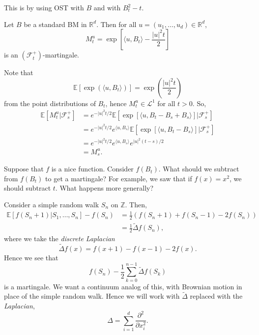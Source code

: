 \documentclass[12pt]{article}
\begin{document}
\begin{proofbox}
	This is by using OST with $B$ and with $B_t^2 - t$.
\end{proofbox}

\begin{proposition}
	Let $B$ be a standard BM in $\mathbb{R}^d$. Then for all $u = (u_1, \ldots, u_d) \in \mathbb{R}^d$,
	\[
		M_t^u = \exp \left[ \langle u, B_t \rangle - \frac{|u|^2t}{2} \right]
	\]
	is an $(\mathcal{F}_t^+)$-martingale.
\end{proposition}

\begin{proofbox}
	Note that
	\[
	\mathbb{E}[\exp ( \langle u, B_t \rangle)] = \exp \left( \frac{|u|^2 t}{2} \right)
	\]
	from the point distributions of $B_t$, hence $M_t^u \in \mathcal{L}^1$ for all $t > 0$. So,
	\begin{align*}
		\mathbb{E}[M_t^u | \mathcal{F}_s^+] &= e^{-|u|^2t/2} \mathbb{E}[\exp [\langle u, B_t - B_s + B_s \rangle ] | \mathcal{F}_s^+] \\
						    &= e^{-|u|^2t/2} e^{\langle u, B_s\rangle} \mathbb{E}[\exp [\langle u, B_t - B_s \rangle] | \mathcal{F}_s^+] \\
						    &= e^{-|u|^2t/2} e^{\langle u, B_s\rangle} e^{|u|^2(t-s)/2} \\
						    &= M_s^u.
	\end{align*}
\end{proofbox}

Suppose that $f$ is a nice function. Consider $f(B_t)$. What should we subtract from $f(B_t)$ to get a martingale? For example, we saw that if $f(x) = x^2$, we should subtract $t$. What happens more generally?

Consider a simple random walk $S_n$ on $\mathbb{Z}$. Then,
\begin{align*}
	\mathbb{E}[f(S_n + 1) | S_1, \ldots, S_n] - f(S_n) &= \frac{1}{2} (f(S_n + 1) + f(S_n - 1) - 2 f(S_n)) \\
							   &= \frac{1}{2} \tilde \Delta f(S_n),
\end{align*}
where we take the \emph{discrete Laplacian}
\[
\tilde \Delta f(x) = f(x + 1) - f(x - 1) - 2f(x).
\]
Hence we see that
\[
f(S_n) - \frac{1}{2} \sum_{k = 0}^{n-1} \tilde \Delta f(S_k)
\]
is a martingale. We want a continuum analog of this, with Brownian motion in place of the simple random walk. Hence we will work with $\tilde \Delta$ replaced with the \emph{Laplacian},
\[
\Delta = \sum_{i = 1}^d \frac{\partial^2}{\partial x_i^2}.
\]
\end{document}
